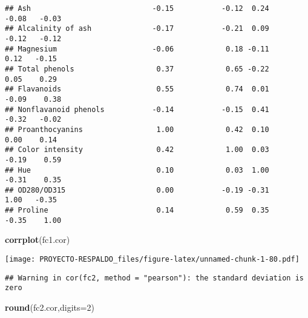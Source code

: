 \documentclass[
]{article}
\newenvironment{Shaded}{\begin{snugshade}}{\end{snugshade}}
\newcommand{\CommentTok}[1]{\textcolor[rgb]{0.56,0.35,0.01}{\textit{#1}}}
\newcommand{\DataTypeTok}[1]{\textcolor[rgb]{0.13,0.29,0.53}{#1}}
\newcommand{\DecValTok}[1]{\textcolor[rgb]{0.00,0.00,0.81}{#1}}
\newcommand{\KeywordTok}[1]{\textcolor[rgb]{0.13,0.29,0.53}{\textbf{#1}}}
\newcommand{\NormalTok}[1]{#1}
\newcommand{\StringTok}[1]{\textcolor[rgb]{0.31,0.60,0.02}{#1}}
\begin{document}
\begin{verbatim}
## Ash                            -0.15           -0.12  0.24       -0.08   -0.03
## Alcalinity of ash              -0.17           -0.21  0.09       -0.12   -0.12
## Magnesium                      -0.06            0.18 -0.11        0.12   -0.15
## Total phenols                   0.37            0.65 -0.22        0.05    0.29
## Flavanoids                      0.55            0.74  0.01       -0.09    0.38
## Nonflavanoid phenols           -0.14           -0.15  0.41       -0.32   -0.02
## Proanthocyanins                 1.00            0.42  0.10        0.00    0.14
## Color intensity                 0.42            1.00  0.03       -0.19    0.59
## Hue                             0.10            0.03  1.00       -0.31    0.35
## OD280/OD315                     0.00           -0.19 -0.31        1.00   -0.35
## Proline                         0.14            0.59  0.35       -0.35    1.00
\end{verbatim}

\begin{Shaded}
\begin{Highlighting}[]
\KeywordTok{corrplot}\NormalTok{(fc1.cor)}
\end{Highlighting}
\end{Shaded}

\texttt{[image: PROYECTO-RESPALDO\_files/figure-latex/unnamed-chunk-1-80.pdf]}

\begin{Shaded}
\end{Shaded}

\begin{verbatim}
## Warning in cor(fc2, method = "pearson"): the standard deviation is zero
\end{verbatim}

\begin{Shaded}
\begin{Highlighting}[]
\KeywordTok{round}\NormalTok{(fc2.cor,}\DataTypeTok{digits=}\DecValTok{2}\NormalTok{)}
\end{Highlighting}
\end{Shaded}
\end{document}
